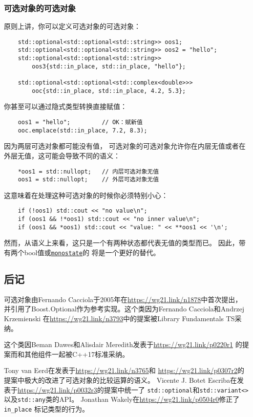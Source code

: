 \subsubsection{可选对象的可选对象}
原则上讲，你可以定义可选对象的可选对象：
\begin{lstlisting}
    std::optional<std::optional<std::string>> oos1;
    std::optional<std::optional<std::string>> oos2 = "hello";
    std::optional<std::optional<std::string>>
        oos3{std::in_place, std::in_place, "hello"};

    std::optional<std::optional<std::complex<double>>>
        ooc{std::in_place, std::in_place, 4.2, 5.3};
\end{lstlisting}
你甚至可以通过隐式类型转换直接赋值：
\begin{lstlisting}
    oos1 = "hello";         // OK：赋新值
    ooc.emplace(std::in_place, 7.2, 8.3);
\end{lstlisting}
因为两层可选对象都可能没有值，
可选对象的可选对象允许你在内层无值或者在外层无值，这可能会导致不同的语义：
\begin{lstlisting}
    *oos1 = std::nullopt;   // 内层可选对象无值
    oos1 = std::nullopt;    // 外层可选对象无值
\end{lstlisting}
这意味着在处理这种可选对象的时候你必须特别小心：
\begin{lstlisting}
    if (!oos1) std::cout << "no value\n";
    if (oos1 && !*oos1) std::cout << "no inner value\n";
    if (oos1 && *oos1) std::cout << "value: " << **oos1 << '\n';
\end{lstlisting}
然而，从语义上来看，这只是一个有两种状态都代表无值的类型而已。
因此，带有两个bool值或\hyperref[ch16.2.1]{\texttt{monostate}}的
将是一个更好的替代。

\subsection{后记}
可选对象由Fernando Cacciola于2005年在\url{https://wg21.link/n1878}中首次提出，
并引用了Boost.Optional作为参考实现。这个类因为Fernando Cacciola和Andrzej Krzemienski
在\url{https://wg21.link/n3793}中的提案被Library Fundamentals TS采纳。

这个类因Beman Dawes和Alisdair Meredith发表于\url{https://wg21.link/p0220r1}
的提案而和其他组件一起被C++17标准采纳。

Tony van Eerd在发表于\url{https://wg21.link/n3765}和
\url{https://wg21.link/p0307r2}的提案中极大的改进了可选对象的比较运算的语义。
Vicente J. Botet Escriba在发表于\url{https://wg21.link/p0032r3}的提案中统一了
\texttt{std::optional}和\texttt{std::variant<>}以及\texttt{std::any}类的API。
Jonathan Wakely在\url{https://wg21.link/p0504r0}修正了\texttt{in\_place}
标记类型的行为。

\setcounter{footnote}{0}